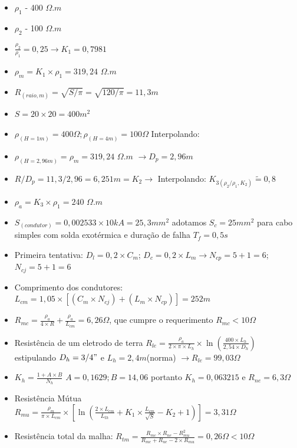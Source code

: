 \documentclass[a4paper,12pt]{report}
\begin{document}
\begin{itemize}
\item ${\rho}_{1}$ - 400 $\Omega.m$     
\item ${\rho}_{2}$ - 100 $\Omega.m$   
\item $\frac{\rho_2}{\rho_1}= 0,25 \longrightarrow K_1=0,7981 $ 
\item $\rho_m = K_1\times\rho_1 = 319,24$ $\Omega.m$ 
\item $R_{(raio, m)} = \sqrt{S/\pi} = \sqrt{120/\pi} = 11,3m$
\item $S = 20\times20 = 400m^2$
\item $\rho_{(H=1m)} = 400\Omega ; \rho_{(H=4m)}=100\Omega $ Interpolando:
\item $\rho_{(H=2,96m)} = \rho_m = 319,24$ $\Omega.m$ $\longrightarrow D_p = 2,96m $
\item $R/D_p = 11,3/2,96 = 6,251m = K_2 \longrightarrow$ Interpolando: $K_{3(\rho_2/\rho_1, K_2)} \tilde{=} 0,8$
\item $\rho_a = K_3\times\rho_1 = 240$ $\Omega.m$ 
\item $S_{(condutor)} = 0,002533\times 10kA = 25,3mm^2$ adotamos $S_c=25mm^2$ para cabo simples com solda exotérmica e duração de falha $T_f = 0,5s$
\item Primeira tentativa: $D_l = 0,2\times C_m $; $D_c = 0,2\times L_m \longrightarrow N_{cp}= 5 + 1 = 6$; $N_{cj} = 5 + 1 = 6$
\item Comprimento dos condutores: $L_{cm}= 1,05\times[(C_m\times N_{cj})+(L_m\times N_{cp})] = 252m$
\item $R_{mc} = \frac{\rho_a}{4\times R} + \frac{\rho_a}{L_{cm}} = 6,26\Omega$, que cumpre o requerimento $R_{mc}<10\Omega$
\item Resistência de um eletrodo de terra $R_{le} = \frac{\rho_a}{2\times\pi\times L_h}\times\ln(\frac{400\times L_h}{2,54\times D_h}) $ estipulando $D_h = 3/4"$ e $L_h=2,4m $(norma) $\longrightarrow R_{le} = 99,03\Omega$
\item $K_h = \frac{1+A\times B}{N_h} $ $A=0,1629 ;B=14,06 $ portanto $K_h=0,063215$ e $R_{ne}=6,3\Omega$ 
\item Resistência Mútua $R_{mu} = \frac{\rho_m}{\pi\times L_{cm}}\times[\ln(\frac{2\times L_{cm}}{L_{th}}+K_1\times\frac{L_{cm}}{\sqrt{S}} - K_2 + 1)] = 3,31\Omega$
\item Resistência total da malha: $R_{tm} = \frac{R_{mc}\times R_{ne} - R_{mu}^2}{R_{mc}+R_{ne}-2\times R_{mu}} = 0,26\Omega < 10\Omega$

\end{itemize}
\end{document}
